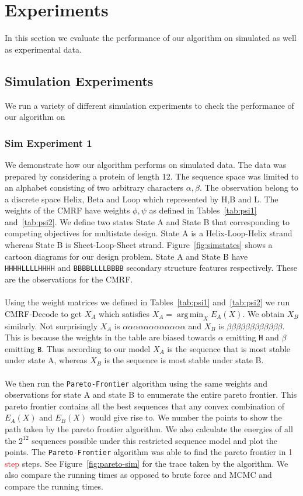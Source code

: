 \documentclass{article}
\DeclareMathOperator*{\argmin}{arg\,min}
\begin{document}
\section{Experiments}
In this section we evaluate the performance of our algorithm on simulated as well as experimental data. 

\subsection{Simulation Experiments}
We run a variety of different simulation experiments to check the performance of our algorithm on 

\subsubsection{Sim Experiment 1}
\label{sim:toy}
We demonstrate how our algorithm performs on simulated data. The data was prepared by considering a protein of length 12. The sequence space was limited to an alphabet consisting of two arbitrary characters $\alpha,\beta$. The observation belong to a discrete space Helix, Beta and Loop which represented by H,B and L. The weights of the CMRF have weights $\phi,\psi$ as defined in Tables~\ref{tab:psi1} and~\ref{tab:psi2}. We define two states State A and State B that corresponding to competing objectives for multistate design. State A is a Helix-Loop-Helix strand whereas State B is Sheet-Loop-Sheet strand. Figure~\ref{fig:simstates} shows a cartoon diagrams for our design problem. State A and State B have \texttt{HHHHLLLLHHHH} and \texttt{BBBBLLLLBBBB} secondary structure features respectively. These are the observations for the CMRF.
\\
\\
Using the weight matrices we defined in Tables~\ref{tab:psi1} and~\ref{tab:psi2} we run CMRF-Decode to get $X_A$ which satisfies $X_A = \argmin_X E_A(X)$. We obtain $X_B$ similarly. Not surprisingly $X_A$ is $\alpha\alpha\alpha\alpha\alpha\alpha\alpha\alpha\alpha\alpha\alpha\alpha$ 
and $X_B$ is $\beta\beta\beta\beta\beta\beta\beta\beta\beta\beta\beta\beta$. This is because the weights in the table are biased towards $\alpha$ emitting \texttt{H} and $\beta$ emitting \texttt{B}. Thus according to our model $X_A$ is the sequence that is most stable under state A, whereas $X_B$ is the sequence is most stable under state B.
\\
\\
We then run the \texttt{Pareto-Frontier} algorithm using the same weights and observations for state A and state B to enumerate the entire pareto frontier. This pareto frontier contains all the best sequences that any convex combination of $E_A(X)$ and $E_B(X)$ would give rise to. We number the points to show the path taken by the pareto frontier algorithm. We also calculate the energies of all the $2^{12}$ sequences possible under this restricted sequence model and plot the points. The \texttt{Pareto-Frontier} algorithm was able to find the pareto frontier in \textcolor{red}{1 step} steps. See Figure~\ref{fig:pareto-sim} for the trace taken by the algorithm.  We also compare the running times as opposed to brute force and MCMC and compare the running times. 
\end{document}
